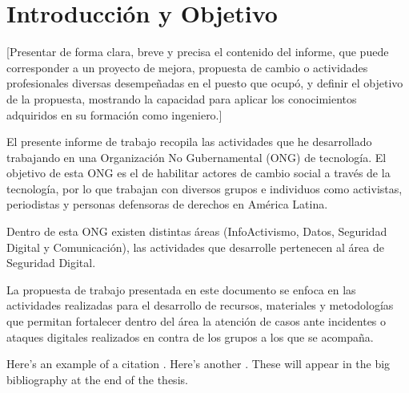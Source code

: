 \documentclass[12pt]{caltech_thesis}
\begin{document}
\chapter{Introducción y Objetivo}

[Presentar de forma clara, breve y precisa el contenido del informe, que puede corresponder a un proyecto de mejora, propuesta de cambio o actividades profesionales diversas desempeñadas en el puesto que ocupó, y definir el objetivo de la propuesta, mostrando la capacidad para aplicar los conocimientos adquiridos en su formación como ingeniero.]

El presente informe de trabajo recopila las actividades que he desarrollado trabajando en una Organización No Gubernamental (ONG)  de tecnología. El objetivo de esta ONG es el de habilitar actores de cambio social a través de la tecnología, por lo que trabajan con diversos grupos e individuos como activistas, periodistas y personas defensoras de derechos en América Latina.

Dentro de esta ONG existen distintas áreas (InfoActivismo, Datos, Seguridad Digital y Comunicación), las actividades que desarrolle pertenecen al área de Seguridad Digital.

La propuesta de trabajo presentada en este documento se enfoca en las actividades realizadas para el desarrollo de recursos, materiales y metodologías que permitan fortalecer dentro del área la atención de casos ante incidentes  o ataques digitales  realizados en contra de los grupos a los que se acompaña.

Here's an example of a citation \citep{GMP81}. Here's another \citep{PP98}. These will appear in the big bibliography at the end of the thesis.


\end{document}

